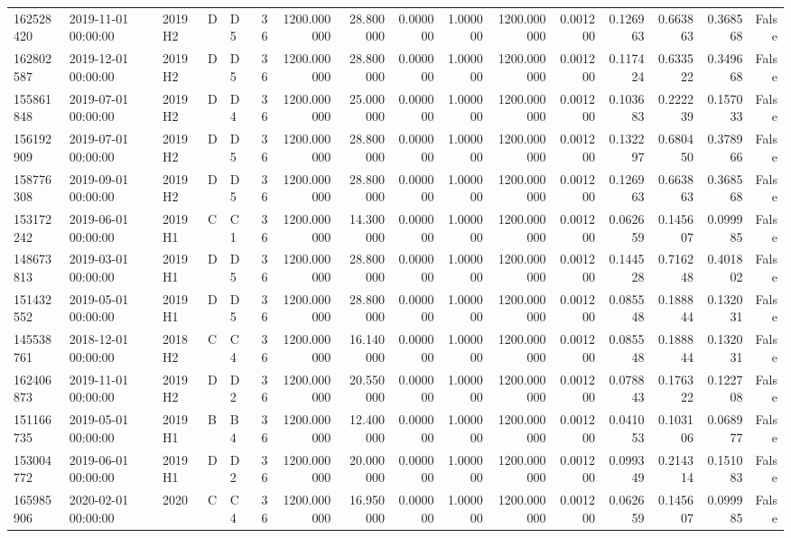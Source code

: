 \begin{tabular}{lllllrrrrrrrrrrr}
162528420 & 2019-11-01 00:00:00 & 2019H2 & D & D5 & 36 & 1200.000000 & 28.800000 & 0.000000 & 1.000000 & 1200.000000 & 0.001200 & 0.126963 & 0.663863 & 0.368568 & False \\
162802587 & 2019-12-01 00:00:00 & 2019H2 & D & D5 & 36 & 1200.000000 & 28.800000 & 0.000000 & 1.000000 & 1200.000000 & 0.001200 & 0.117424 & 0.633522 & 0.349668 & False \\
155861848 & 2019-07-01 00:00:00 & 2019H2 & D & D4 & 36 & 1200.000000 & 25.000000 & 0.000000 & 1.000000 & 1200.000000 & 0.001200 & 0.103683 & 0.222239 & 0.157033 & False \\
156192909 & 2019-07-01 00:00:00 & 2019H2 & D & D5 & 36 & 1200.000000 & 28.800000 & 0.000000 & 1.000000 & 1200.000000 & 0.001200 & 0.132297 & 0.680450 & 0.378966 & False \\
158776308 & 2019-09-01 00:00:00 & 2019H2 & D & D5 & 36 & 1200.000000 & 28.800000 & 0.000000 & 1.000000 & 1200.000000 & 0.001200 & 0.126963 & 0.663863 & 0.368568 & False \\
153172242 & 2019-06-01 00:00:00 & 2019H1 & C & C1 & 36 & 1200.000000 & 14.300000 & 0.000000 & 1.000000 & 1200.000000 & 0.001200 & 0.062659 & 0.145607 & 0.099985 & False \\
148673813 & 2019-03-01 00:00:00 & 2019H1 & D & D5 & 36 & 1200.000000 & 28.800000 & 0.000000 & 1.000000 & 1200.000000 & 0.001200 & 0.144528 & 0.716248 & 0.401802 & False \\
151432552 & 2019-05-01 00:00:00 & 2019H1 & D & D5 & 36 & 1200.000000 & 28.800000 & 0.000000 & 1.000000 & 1200.000000 & 0.001200 & 0.085548 & 0.188844 & 0.132031 & False \\
145538761 & 2018-12-01 00:00:00 & 2018H2 & C & C4 & 36 & 1200.000000 & 16.140000 & 0.000000 & 1.000000 & 1200.000000 & 0.001200 & 0.085548 & 0.188844 & 0.132031 & False \\
162406873 & 2019-11-01 00:00:00 & 2019H2 & D & D2 & 36 & 1200.000000 & 20.550000 & 0.000000 & 1.000000 & 1200.000000 & 0.001200 & 0.078843 & 0.176322 & 0.122708 & False \\
151166735 & 2019-05-01 00:00:00 & 2019H1 & B & B4 & 36 & 1200.000000 & 12.400000 & 0.000000 & 1.000000 & 1200.000000 & 0.001200 & 0.041053 & 0.103106 & 0.068977 & False \\
153004772 & 2019-06-01 00:00:00 & 2019H1 & D & D2 & 36 & 1200.000000 & 20.000000 & 0.000000 & 1.000000 & 1200.000000 & 0.001200 & 0.099349 & 0.214314 & 0.151083 & False \\
165985906 & 2020-02-01 00:00:00 & 2020 & C & C4 & 36 & 1200.000000 & 16.950000 & 0.000000 & 1.000000 & 1200.000000 & 0.001200 & 0.062659 & 0.145607 & 0.099985 & False \\

\end{tabular}
